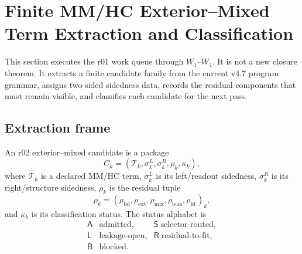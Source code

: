 \section{Finite MM/HC Exterior--Mixed Term Extraction and Classification}
\label{sec:v470-r02-extmix-term-extraction-classification}
This section executes the r01 work queue through \(W_1\)--\(W_4\).  It is not a
new closure theorem.  It extracts a finite candidate family from the current
v4.7 program grammar, assigns two-sided sidedness data, records the residual
components that must remain visible, and classifies each candidate for the next
pass.

\subsection{Extraction frame}
\label{subsec:v470-r02-extraction-frame}

\begin{definition}
\label{def:v470-r02-extmix-candidate}
An r02 exterior--mixed candidate is a package
\[
C_k=
\left(
\mathcal T_k,
\sigma_k^{L},
\sigma_k^{R},
\rho_k,
\kappa_k
\right),
\]
where \(\mathcal T_k\) is a declared MM/HC term, \(\sigma_k^{L}\) is its
left/readout sidedness, \(\sigma_k^{R}\) is its right/structure sidedness,
\(\rho_k\) is the residual tuple
\[
\rho_k=
(\rho_{\mathrm{bd}},\rho_{\mathrm{ext}},\rho_{\mathrm{mix}},
 \rho_{\mathrm{leak}},\rho_{\mathrm{fit}})_k,
\]
and \(\kappa_k\) is its classification status.  The status alphabet is
\[
\begin{array}{lll}
\mathsf A & \text{admitted}, &
\mathsf S \; \text{selector-routed},\\
\mathsf L & \text{leakage-open}, &
\mathsf R \; \text{residual-to-fit},\\
\mathsf B & \text{blocked}. &
\end{array}
\]
\end{definition}

